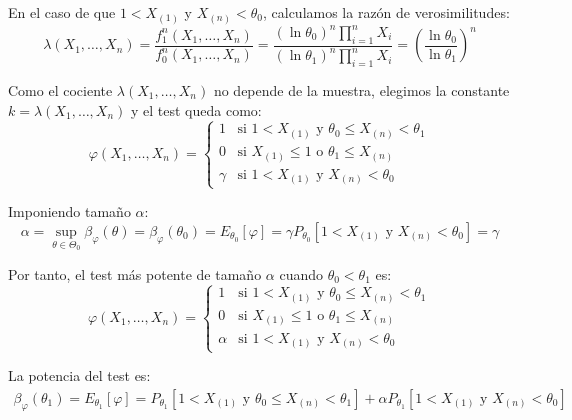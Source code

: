 \begin{ejercicio}
\begin{description}
        En el caso de que $1 < X_{(1)}$ y $X_{(n)} < \theta_0$, calculamos la razón de verosimilitudes:
        \begin{equation*}
            \lambda(X_1, \ldots, X_n) = \frac{f_1^n(X_1, \ldots, X_n)}{f_0^n(X_1, \ldots, X_n)} = \frac{(\ln \theta_0)^n \prod\limits_{i=1}^n X_i}{(\ln \theta_1)^n \prod\limits_{i=1}^n X_i} = \left(\frac{\ln \theta_0}{\ln \theta_1}\right)^n
        \end{equation*}

        Como el cociente $\lambda(X_1, \ldots, X_n)$ no depende de la muestra, elegimos la constante $k = \lambda(X_1, \ldots, X_n)$ y el test queda como:
        \begin{equation*}
            \varphi(X_1, \ldots, X_n) = \left\{\begin{array}{ll}
                1 & \text{si\ } 1 < X_{(1)} \text{\ y\ } \theta_0 \leq X_{(n)} < \theta_1 \\
                0 & \text{si\ } X_{(1)} \leq 1 \text{\ o\ } \theta_1 \leq X_{(n)} \\
                \gamma & \text{si\ } 1 < X_{(1)} \text{\ y\ } X_{(n)} < \theta_0
            \end{array}\right.
        \end{equation*}

        Imponiendo tamaño $\alpha$:
        \begin{equation*}
            \alpha = \sup_{\theta \in \Theta_0}\beta_\varphi(\theta) = \beta_\varphi(\theta_0) = E_{\theta_0}[\varphi] = \gamma P_{\theta_0}[1 < X_{(1)} \text{\ y\ } X_{(n)} < \theta_0] = \gamma
        \end{equation*}

        Por tanto, el test más potente de tamaño $\alpha$ cuando $\theta_0 < \theta_1$ es:
        \begin{equation*}
            \varphi(X_1, \ldots, X_n) = \left\{\begin{array}{ll}
                1 & \text{si\ } 1 < X_{(1)} \text{\ y\ } \theta_0 \leq X_{(n)} < \theta_1 \\
                0 & \text{si\ } X_{(1)} \leq 1 \text{\ o\ } \theta_1 \leq X_{(n)} \\
                \alpha & \text{si\ } 1 < X_{(1)} \text{\ y\ } X_{(n)} < \theta_0
            \end{array}\right.
        \end{equation*}

        La potencia del test es:
        \begin{align*}
            \beta_\varphi(\theta_1) = E_{\theta_1}[\varphi] = P_{\theta_1}[1 < X_{(1)} \text{\ y\ } \theta_0 \leq X_{(n)} < \theta_1] + \alpha P_{\theta_1}[1 < X_{(1)} \text{\ y\ } X_{(n)} < \theta_0]
        \end{align*}


\end{description}
\end{ejercicio}
